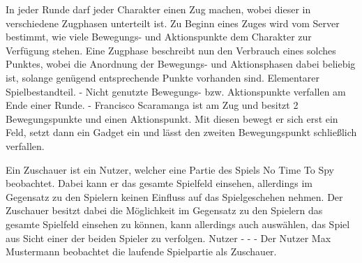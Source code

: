 {In jeder Runde darf jeder Charakter einen Zug machen, wobei dieser in verschiedene Zugphasen unterteilt ist. Zu Beginn eines Zuges wird vom Server bestimmt, wie viele Bewegungs- und Aktionspunkte dem Charakter zur Verfügung stehen. Eine Zugphase beschreibt nun den Verbrauch eines solches Punktes, wobei die Anordnung der Bewegungs- und Aktionsphasen dabei beliebig ist, solange genügend entsprechende Punkte vorhanden sind.}
{Elementarer Spielbestandteil.}
{-}
{Nicht genutzte Bewegungs- bzw. Aktionspunkte verfallen am Ende einer Runde.}
{-}
{Francisco Scaramanga ist am Zug und besitzt 2 Bewegungspunkte und einen Aktionspunkt. Mit diesen bewegt er sich erst ein Feld, setzt dann ein Gadget ein und lässt den zweiten Bewegungspunkt schließlich verfallen.}

{Ein Zuschauer ist ein Nutzer, welcher eine Partie des Spiels \glqq{}No Time To Spy\grqq{} {} beobachtet. Dabei kann er das gesamte Spielfeld einsehen, allerdings im Gegensatz zu den Spielern keinen Einfluss auf das Spielgeschehen nehmen. Der Zuschauer besitzt dabei die Möglichkeit im Gegensatz zu den Spielern das gesamte Spielfeld einsehen zu können, kann allerdings auch auswählen, das Spiel aus Sicht einer der beiden Spieler zu verfolgen.}
{Nutzer}
{-}
{-}
{-}
{Der Nutzer \glqq{}Max Mustermann\grqq{} beobachtet die laufende Spielpartie als Zuschauer.}

